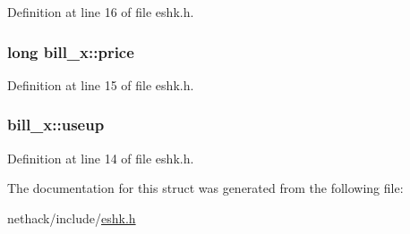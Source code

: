 Definition at line 16 of file eshk.\+h.

\hypertarget{structbill__x_a7ace451854a7f4ca1a0beffb6f3e1183}{
\subsubsection[{price}]{\setlength{\rightskip}{0pt plus 5cm}long bill\+\_\+x\+::price}}\label{structbill__x_a7ace451854a7f4ca1a0beffb6f3e1183}


Definition at line 15 of file eshk.\+h.

\hypertarget{structbill__x_ad37f4e566f8bd240e0fa62318788b9a4}{
\subsubsection[{useup}]{ bill\+\_\+x\+::useup}}\label{structbill__x_ad37f4e566f8bd240e0fa62318788b9a4}


Definition at line 14 of file eshk.\+h.



The documentation for this struct was generated from the following file\+:\begin{DoxyCompactItemize}
\item 
nethack/include/\hyperlink{eshk_8h}{eshk.\+h}\end{DoxyCompactItemize}
